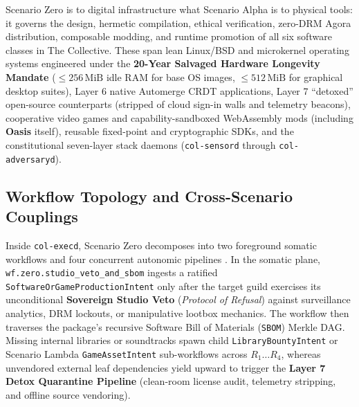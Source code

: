 Scenario Zero is to digital infrastructure what Scenario Alpha is to physical tools: it governs the
design, hermetic compilation, ethical verification, zero-DRM Agora distribution, composable modding,
and runtime promotion of all six software classes in The Collective. These span lean Linux/BSD and
microkernel operating systems engineered under the \textbf{20-Year Salvaged Hardware Longevity
Mandate} ($\le 256\,\mathrm{MiB}$ idle RAM for base OS images, $\le 512\,\mathrm{MiB}$ for graphical
desktop suites), Layer 6 native Automerge CRDT applications, Layer 7 ``detoxed'' open-source
counterparts (stripped of cloud sign-in walls and telemetry beacons), cooperative video games and
capability-sandboxed WebAssembly mods (including \textbf{Oasis} itself), reusable fixed-point and
cryptographic SDKs, and the constitutional seven-layer stack daemons (\texttt{col-sensord} through
\texttt{col-adversaryd}).

\subsection{Workflow Topology and Cross-Scenario Couplings}

Inside \texttt{col-execd}, Scenario Zero decomposes into two foreground somatic workflows and four
concurrent autonomic pipelines \parencite{omg2011bpmn,chinosi2012bpmn}. In the somatic plane,
\texttt{wf.zero.studio\_veto\_and\_sbom} ingests a ratified \texttt{SoftwareOrGameProductionIntent}
only after the target guild exercises its unconditional \textbf{Sovereign Studio Veto}
(\textit{Protocol of Refusal}) against surveillance analytics, DRM lockouts, or manipulative
lootbox mechanics. The workflow then traverses the package's recursive Software Bill of Materials
(\texttt{SBOM}) Merkle DAG. Missing internal libraries or soundtracks spawn child
\texttt{LibraryBountyIntent} or Scenario Lambda \texttt{GameAssetIntent} sub-workflows across
$R_1 \dots R_4$, whereas unvendored external leaf dependencies yield upward to trigger the
\textbf{Layer 7 Detox Quarantine Pipeline} (clean-room license audit, telemetry stripping, and
offline source vendoring).

